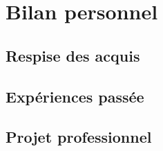 \chapter{Bilan personnel}
\lipsum
\section{Respise des acquis}
\lipsum
\section{Expériences passée}
\lipsum
\section{Projet professionnel}
\lipsum

